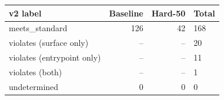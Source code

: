 \begin{tabular}{lrrl}
\toprule
\textbf{v2 label} & \textbf{Baseline} & \textbf{Hard-50} & \textbf{Total} \\
\midrule
meets\_standard & 126 & 42 & 168 \\
violates (surface only) & -- & -- & 20 \\
violates (entrypoint only) & -- & -- & 11 \\
violates (both) & -- & -- & 1 \\
undetermined & 0 & 0 & 0 \\
\bottomrule
\end{tabular}
